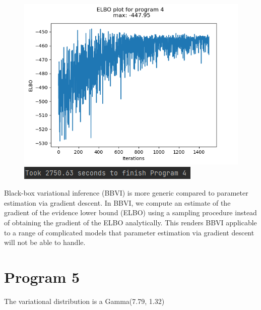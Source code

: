 \documentclass[10pt]{homeworg}
\begin{document}
\begin{figure}[!htbp]
    \centering
    \begin{minipage}{0.45\textwidth}
        \centering
       \includegraphics[scale=0.5]{figures/elbo_program_4.png}
    \end{minipage}\hfill
    \begin{minipage}{0.45\textwidth}
        \centering
        \includegraphics[scale=0.8]{figures/program4_time.png}
    \end{minipage}
\end{figure}

\newpage

Black-box variational inference (BBVI) is more generic compared to parameter estimation via gradient descent. In BBVI, we compute an estimate of the gradient of the evidence lower bound (ELBO) using a sampling procedure instead of obtaining the gradient of the ELBO analytically. This renders BBVI applicable to a range of complicated models that parameter estimation via gradient descent will not be able to handle.


\section{Program 5}

The variational distribution is a Gamma(7.79, 1.32)
\end{document}

